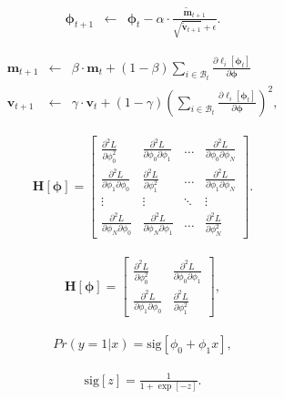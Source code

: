 \documentclass[letterpaper,twoside,openany, titlepage,oldfontcommands,titles,dvipsnames]{memoir}
\begin{document}
\begin{eqnarray}
 \boldsymbol\phi_{t+1} &\leftarrow & \boldsymbol\phi_{t} - \alpha\cdot\frac{ \tilde{\mathbf{m}}_{t+1}}{\sqrt{\tilde{\mathbf{v}}_{t+1}}+\epsilon}.
 \end{eqnarray}

\begin{eqnarray}\label{eq:train_adam_final}
  \mathbf{m}_{t+1} &\leftarrow& \beta \cdot \mathbf{m}_{t} + (1-\beta) \sum_{i\in\mathcal{B}_{t}}\frac{\partial \ell_i[\boldsymbol\phi_{t}]}{\partial \boldsymbol\phi}\nonumber \\
  \mathbf{v}_{t+1} &\leftarrow& \gamma \cdot \mathbf{v}_{t} + (1-\gamma) \left(\sum_{i\in\mathcal{B}_{t}}\frac{\partial \ell_i[\boldsymbol\phi_{t}]}{\partial \boldsymbol\phi}\right)^2,
 \end{eqnarray}

\begin{eqnarray}
 \mathbf{H}[\boldsymbol\phi] = \begin{bmatrix} \frac{\partial^{2} L}{\partial\phi_{0}^{2}} & \frac{\partial^{2} L}{\partial\phi_{0}\partial\phi_{1}} &\hdots &\frac{\partial^{2} L}{\partial\phi_{0}\partial\phi_{N}}\\ 
 \frac{\partial^{2} L}{\partial\phi_{1}\partial\phi_{0}} &\frac{\partial^{2} L}{\partial\phi_{1}^{2}} &\hdots&\frac{\partial^{2} L}{\partial\phi_{1}\partial\phi_{N}} \\ \vdots &\vdots & \ddots &\vdots\\ 
 \frac{\partial^{2} L}{\partial\phi_{N}\partial\phi_{0}} &\frac{\partial^{2} L}{\partial\phi_{N}\partial\phi_{1}} &\hdots&\frac{\partial^{2} L}{\partial\phi_{N}^2} \end{bmatrix}.
 \end{eqnarray}

\begin{eqnarray}
 \mathbf{H}[\boldsymbol\phi] = \begin{bmatrix} \frac{\partial^{2} L}{\partial\phi_{0}^{2}} & \frac{\partial^{2} L}{\partial\phi_{0}\partial\phi_{1}}\\ 
 \frac{\partial^{2} L}{\partial\phi_{1}\partial\phi_{0}} &\frac{\partial^{2} L}{\partial\phi_{1}^{2}} \end{bmatrix},
 \end{eqnarray}

\begin{eqnarray}
 Pr(y=1|x) = \mbox{sig}[\phi_{0}+\phi_{1}x],
 \end{eqnarray}

\begin{eqnarray}
  \mbox{sig}[z] = \frac{1}{1+\exp[-z]}.
 \end{eqnarray}
\end{document}
